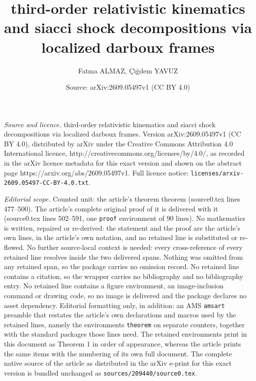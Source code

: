 \documentclass[10pt,a4paper]{amsart}
\title{third-order relativistic kinematics and siacci shock decompositions via localized darboux frames}
\author{Fatma ALMAZ, \c{C}\.{ı}\u{g}dem YAVUZ}
\date{Source: arXiv:2609.05497v1 (CC BY 4.0)}
\begin{document}
\maketitle

\noindent\emph{Source and licence.} third-order relativistic kinematics and siacci shock decompositions via localized darboux frames. Version arXiv:2609.05497v1 (CC BY 4.0), distributed by arXiv under the Creative Commons Attribution 4.0 International licence, http://creativecommons.org/licenses/by/4.0/, as recorded in the arXiv licence metadata for this exact version and shown on the abstract page https://arxiv.org/abs/2609.05497v1. Full licence notice: \texttt{licenses/arxiv-2609.05497-CC-BY-4.0.txt}.\par\smallskip

\noindent\textit{Editorial scope.} Counted unit: the article's theorem theorem (source0.tex lines 477--500). The article's complete original proof of it is delivered with it (source0.tex lines 502--591, one \texttt{proof} environment of 90 lines). No mathematics is written, repaired or re-derived: the statement and the proof are the article's own lines, in the article's own notation, and no retained line is substituted or re-flowed.  No further source-local context is needed: every cross-reference of every retained line resolves inside the two delivered spans.  Nothing was omitted from any retained span, so the package carries no omission record.  No retained line contains a citation, so the wrapper carries no bibliography and no bibliography entry.  No retained line contains a figure environment, an image-inclusion command or drawing code, so no image is delivered and the package declares no asset dependency.  Editorial formatting only, in addition: an AMS \texttt{amsart} preamble that restates the article's own declarations and macros used by the retained lines, namely the environments \texttt{theorem} on separate counters, together with the standard packages those lines need.  The retained environments print in this document as Theorem 1 in order of appearance, whereas the article prints the same items with the numbering of its own full document.  The complete native source of the article as distributed in the arXiv e-print for this exact version is bundled unchanged as \texttt{sources/209440/source0.tex}.
\end{document}
